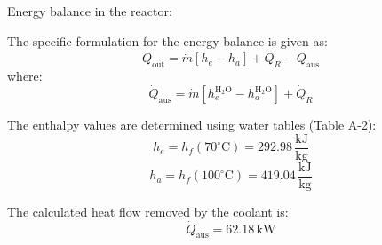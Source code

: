 Energy balance in the reactor:  

The specific formulation for the energy balance is given as:  
\[
\dot{Q}_{\text{out}} = \dot{m} \left[ h_e - h_a \right] + \dot{Q}_R - \dot{Q}_{\text{aus}}
\]  
where:  
\[
\dot{Q}_{\text{aus}} = \dot{m} \left[ h_e^{\text{H}_2\text{O}} - h_a^{\text{H}_2\text{O}} \right] + \dot{Q}_R
\]  

The enthalpy values are determined using water tables (Table A-2):  
\[
h_e = h_f(70^\circ\text{C}) = 292.98 \, \frac{\text{kJ}}{\text{kg}}
\]  
\[
h_a = h_f(100^\circ\text{C}) = 419.04 \, \frac{\text{kJ}}{\text{kg}}
\]  

The calculated heat flow removed by the coolant is:  
\[
\dot{Q}_{\text{aus}} = 62.18 \, \text{kW}
\]